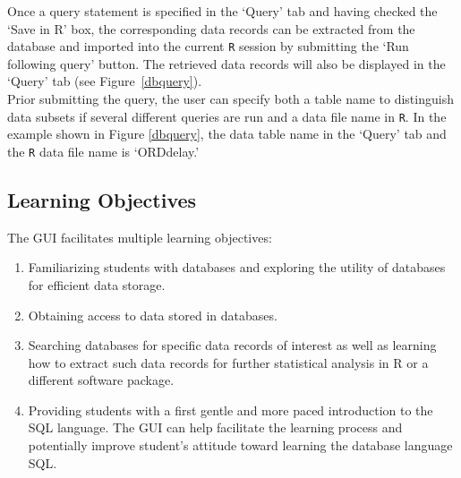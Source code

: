 \documentclass[11pt]{tise_style}
\begin{document}
Once a query statement is specified in the `Query' tab and having checked the `Save in R' box, the corresponding data records can be extracted from the database and imported into the current {\tt R} session by submitting the `Run following query' button.  The retrieved data records will also be displayed in the `Query' tab (see Figure~\ref{dbquery}). \\
Prior submitting the query, the user can specify both a table name to distinguish data subsets if several different queries are run and a data file name in {\tt R}. In the example shown in Figure \ref{dbquery}, the data table name in the `Query' tab and the {\tt R} data file name is `ORDdelay.'
%
%
%
%



\subsection{{Learning Objectives}}

%

The GUI facilitates multiple learning objectives: 

\begin{enumerate}
	\item Familiarizing students with databases and exploring the utility of databases for efficient data storage.
	\item Obtaining access to data stored in databases. 
	\item Searching databases for specific data records of interest as well as learning how to extract such data records for further statistical analysis in R or a different software package. 
	\item Providing students with a first gentle and more paced introduction to the SQL language. The GUI can help facilitate the learning process and potentially improve student's attitude toward learning the database language SQL.
\end{enumerate}	
 
\end{document}
